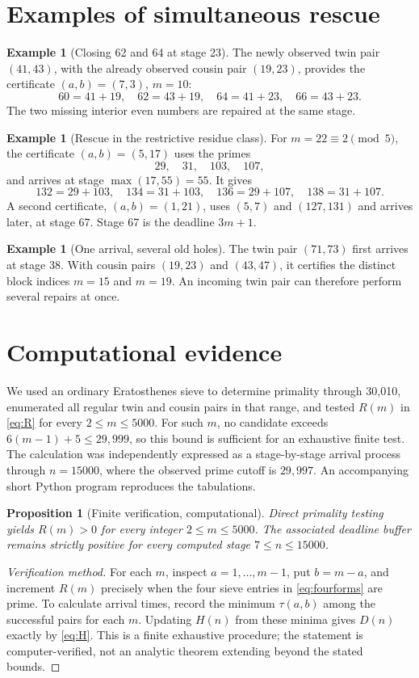 \documentclass[11pt,a4paper]{article}
\numberwithin{equation}{section}
\newtheorem{proposition}[conjecture]{Proposition}
\theoremstyle{definition}
\newtheorem{example}[conjecture]{Example}
\begin{document}
\section{Examples of simultaneous rescue}
\begin{example}[Closing 62 and 64 at stage 23]\label{ex:62}
The newly observed twin pair \((41,43)\), with the already observed cousin pair \((19,23)\), provides the certificate \((a,b)=(7,3)\), \(m=10\):
\[
60=41+19,\quad62=43+19,\quad64=41+23,\quad66=43+23.
\]
The two missing interior even numbers are repaired at the same stage.
\end{example}
\begin{example}[Rescue in the restrictive residue class]\label{ex:134}
For \(m=22\equiv2\pmod5\), the certificate \((a,b)=(5,17)\) uses the primes
\[
29,\quad31,\quad103,\quad107,
\]
and arrives at stage \(\max(17,55)=55\). It gives
\[
132=29+103,\quad134=31+103,\quad136=29+107,\quad138=31+107.
\]
A second certificate, \((a,b)=(1,21)\), uses \((5,7)\) and \((127,131)\) and arrives later, at stage 67. Stage 67 is the deadline \(3m+1\).
\end{example}
\begin{example}[One arrival, several old holes]
The twin pair \((71,73)\) first arrives at stage 38. With cousin pairs \((19,23)\) and \((43,47)\), it certifies the distinct block indices \(m=15\) and \(m=19\). An incoming twin pair can therefore perform several repairs at once.
\end{example}

\section{Computational evidence}
We used an ordinary Eratosthenes sieve to determine primality through 30,010, enumerated all regular twin and cousin pairs in that range, and tested \(R(m)\) in \eqref{eq:R} for every \(2\le m\le5000\). For such \(m\), no candidate exceeds \(6(m-1)+5\le29{,}999\), so this bound is sufficient for an exhaustive finite test. The calculation was independently expressed as a stage-by-stage arrival process through \(n=15000\), where the observed prime cutoff is \(29{,}997\). An accompanying short Python program reproduces the tabulations.

\begin{proposition}[Finite verification, computational]\label{prop:finite}
Direct primality testing yields \(R(m)>0\) for every integer \(2\le m\le5000\). The associated deadline buffer remains strictly positive for every computed stage \(7\le n\le15000\).
\end{proposition}
\begin{proof}[Verification method]
For each \(m\), inspect \(a=1,\ldots,m-1\), put \(b=m-a\), and increment \(R(m)\) precisely when the four sieve entries in \eqref{eq:fourforms} are prime. To calculate arrival times, record the minimum \(\tau(a,b)\) among the successful pairs for each \(m\). Updating \(H(n)\) from these minima gives \(D(n)\) exactly by \eqref{eq:H}. This is a finite exhaustive procedure; the statement is computer-verified, not an analytic theorem extending beyond the stated bounds.
\end{proof}
\end{document}
